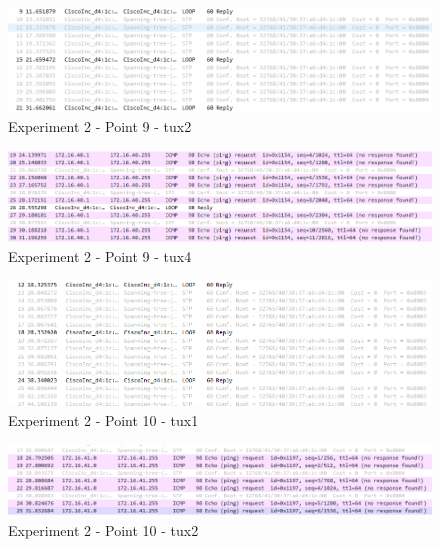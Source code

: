 \documentclass[a4paper]{article}
\begin{document}
	\begin{figure}[H]
	\begin{center}
  	\includegraphics[width=\linewidth]{exp2_9_tux2.png}
  	\caption{Experiment 2 - Point 9 - tux2}
  	\label{fig:Experiment 2 - Point 9 - tux2}
	\end{center}
	\end{figure}

	\begin{figure}[H]
	\begin{center}
  	\includegraphics[width=\linewidth]{exp2_9_tux4.png}
  	\caption{Experiment 2 - Point 9 - tux4}
  	\label{fig:Experiment 2 - Point 9 - tux4}
	\end{center}
	\end{figure}

		\begin{figure}[H]
	\begin{center}
  	\includegraphics[width=\linewidth]{exp2_10_tux1.png}
  	\caption{Experiment 2 - Point 10 - tux1}
  	\label{fig:Experiment 2 - Point 10 - tux1}
	\end{center}
	\end{figure}

	\begin{figure}[H]
	\begin{center}
  	\includegraphics[width=\linewidth]{exp2_10_tux2.png}
  	\caption{Experiment 2 - Point 10 - tux2}
  	\label{fig:Experiment 2 - Point 10 - tux2}
	\end{center}
	\end{figure}
\end{document}
